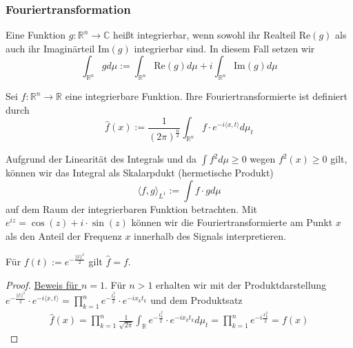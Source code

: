 \subsubsection{Fouriertransformation}
Eine Funktion $g :\mathbb{R}^n \to \mathbb{C}$ heißt integrierbar, wenn sowohl ihr Realteil $\text{Re}(g) $ als auch ihr Imaginärteil $\text{Im}(g) $  integrierbar sind. In diesem Fall setzen wir
$$ \int_{\mathbb{R}^n} g d \mu :=  \int_{\mathbb{R}^n}  \text{Re}(g) d \mu  + i \int_{\mathbb{R}^n}  \text{Im}(g) d \mu$$
\begin{Definition}
Sei $f: \mathbb{R}^n \to \mathbb{R}$ eine integrierbare Funktion. Ihre Fouriertransformierte ist definiert durch 
$$ \hat{f}(x) :=  \frac{1}{ (2 \pi)^{\frac{n}{2}}} \int_{\mathbb{R}^n} f  \cdot e^{ - i \langle x , t  \rangle }d \mu_{t}  $$
\end{Definition}

Aufgrund der Linearität des Integrals und da $\int f^2 d \mu  \geq 0$ wegen $f^2(x) \geq 0$ gilt, können wir das Integral als Skalarpdukt (hermetische Produkt)
$$ \langle f ,g \rangle_{L^1} := \int f \cdot g d \mu$$
auf dem Raum der integrierbaren Funktion betrachten.  Mit $ e^{i z} = \cos(z) + i\cdot  \sin(z) $ können wir die Fouriertransformierte am Punkt $x$ als den Anteil  der  Frequenz $x$ innerhalb des Signals interpretieren. 

\begin{Beispiel}
\label{hatgleichf}
Für $f(t) := e^{- \frac{ ||t||^2 }{2}}$ gilt $\hat{f} = f$.
\end{Beispiel}
\begin{proof}
\href{https://mathworld.wolfram.com/FourierTransformGaussian.html}{Beweis für $n=1$}.
Für $n > 1$ erhalten wir mit der Produktdarstellung $e^{- \frac{ ||t||^2 }{2}} \cdot e^{ - i \langle x , t  \rangle } = \prod_{k=1}^n e^{-\frac{t_k^2}{2}} \cdot e^{-ix_kt_k}$ und dem Produktsatz
\begin{align*}
\hat{f}(x)  =  \prod_{k=1}^n \frac{1}{\sqrt{2 \pi}} \int_{\mathbb{R} } e^{-\frac{t_k^2}{2}} \cdot e^{-ix_kt_k} d \mu_t = \prod_{k=1}^n e^{-i \frac{x^2_k}{2}} = f(x)
\end{align*}

\end{proof}

